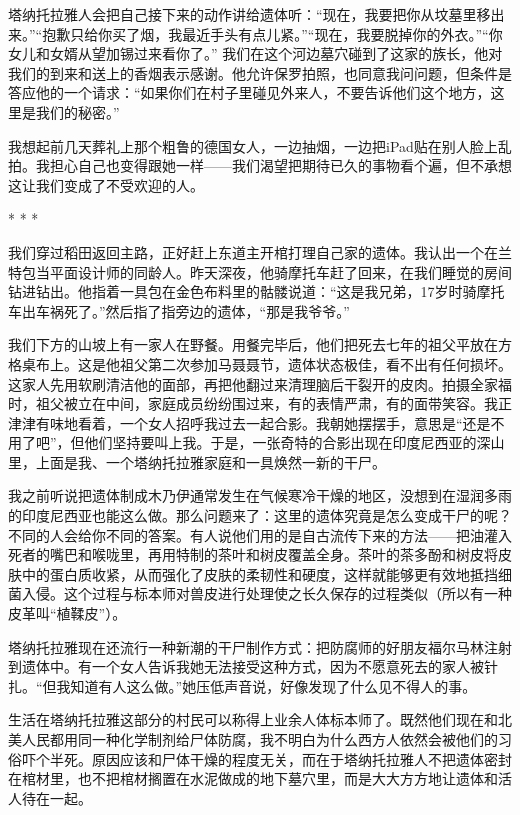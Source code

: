 \documentclass[12pt,oneside]{book}
\begin{document}
\begin{bookref}[frametitle={\cite{好好告别}}]
塔纳托拉雅人会把自己接下来的动作讲给遗体听：“现在，我要把你从坟墓里移出来。”“抱歉只给你买了烟，我最近手头有点儿紧。”“现在，我要脱掉你的外衣。”“你女儿和女婿从望加锡过来看你了。”
我们在这个河边墓穴碰到了这家的族长，他对我们的到来和送上的香烟表示感谢。他允许保罗拍照，也同意我问问题，但条件是答应他的一个请求：“如果你们在村子里碰见外来人，不要告诉他们这个地方，这里是我们的秘密。”

我想起前几天葬礼上那个粗鲁的德国女人，一边抽烟，一边把iPad贴在别人脸上乱拍。我担心自己也变得跟她一样——我们渴望把期待已久的事物看个遍，但不承想这让我们变成了不受欢迎的人。

\begin{center}
* * *
\end{center}

我们穿过稻田返回主路，正好赶上东道主开棺打理自己家的遗体。我认出一个在兰特包当平面设计师的同龄人。昨天深夜，他骑摩托车赶了回来，在我们睡觉的房间钻进钻出。他指着一具包在金色布料里的骷髅说道：“这是我兄弟，17岁时骑摩托车出车祸死了。”然后指了指旁边的遗体，“那是我爷爷。”

我们下方的山坡上有一家人在野餐。用餐完毕后，他们把死去七年的祖父平放在方格桌布上。这是他祖父第二次参加马聂聂节，遗体状态极佳，看不出有任何损坏。这家人先用软刷清洁他的面部，再把他翻过来清理脑后干裂开的皮肉。拍摄全家福时，祖父被立在中间，家庭成员纷纷围过来，有的表情严肃，有的面带笑容。我正津津有味地看着，一个女人招呼我过去一起合影。我朝她摆摆手，意思是“还是不用了吧”，但他们坚持要叫上我。于是，一张奇特的合影出现在印度尼西亚的深山里，上面是我、一个塔纳托拉雅家庭和一具焕然一新的干尸。

我之前听说把遗体制成木乃伊通常发生在气候寒冷干燥的地区，没想到在湿润多雨的印度尼西亚也能这么做。那么问题来了：这里的遗体究竟是怎么变成干尸的呢？不同的人会给你不同的答案。有人说他们用的是自古流传下来的方法——把油灌入死者的嘴巴和喉咙里，再用特制的茶叶和树皮覆盖全身。茶叶的茶多酚和树皮将皮肤中的蛋白质收紧，从而强化了皮肤的柔韧性和硬度，这样就能够更有效地抵挡细菌入侵。这个过程与标本师对兽皮进行处理使之长久保存的过程类似（所以有一种皮革叫“植鞣皮”）。

塔纳托拉雅现在还流行一种新潮的干尸制作方式：把防腐师的好朋友福尔马林注射到遗体中。有一个女人告诉我她无法接受这种方式，因为不愿意死去的家人被针扎。“但我知道有人这么做。”她压低声音说，好像发现了什么见不得人的事。

生活在塔纳托拉雅这部分的村民可以称得上业余人体标本师了。既然他们现在和北美人民都用同一种化学制剂给尸体防腐，我不明白为什么西方人依然会被他们的习俗吓个半死。原因应该和尸体干燥的程度无关，而在于塔纳托拉雅人不把遗体密封在棺材里，也不把棺材搁置在水泥做成的地下墓穴里，而是大大方方地让遗体和活人待在一起。


\end{bookref}
\end{document}
